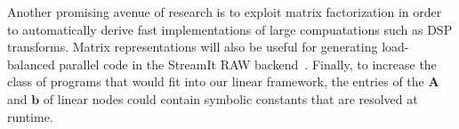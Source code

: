 Another promising avenue of research is to exploit matrix
factorization in order to automatically derive fast implementations of
large compuatations such as DSP transforms.  Matrix representations
will also be useful for generating load-balanced parallel code in the
StreamIt RAW backend~\cite{streamit-asplos}.  Finally, to increase the
class of programs that would fit into our linear framework, the
entries of the ${\mathbf A}$ and ${\mathbf b}$ of linear nodes could
contain symbolic constants that are resolved at runtime.

